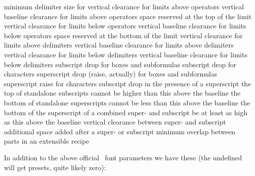 \NC \type {\Umathfractiondelsize}    \NC minimum delimiter size for  \NC \NR
\NC \type {\Umathlimitabovevgap}     \NC vertical clearance for limits above operators \NC \NR
\NC \type {\Umathlimitabovebgap}     \NC vertical baseline clearance for limits above operators \NC \NR
\NC \type {\Umathlimitabovekern}     \NC space reserved at the top of the limit \NC \NR
\NC \type {\Umathlimitbelowvgap}     \NC vertical clearance for limits below operators \NC \NR
\NC \type {\Umathlimitbelowbgap}     \NC vertical baseline clearance for limits below operators \NC \NR
\NC \type {\Umathlimitbelowkern}     \NC space reserved at the bottom of the limit \NC \NR
\NC \type {\Umathoverdelimitervgap}  \NC vertical clearance for limits above delimiters \NC \NR
\NC \type {\Umathoverdelimiterbgap}  \NC vertical baseline clearance for limits above delimiters \NC \NR
\NC \type {\Umathunderdelimitervgap} \NC vertical clearance for limits below delimiters \NC \NR
\NC \type {\Umathunderdelimiterbgap} \NC vertical baseline clearance for limits below delimiters \NC \NR
\NC \type {\Umathsubshiftdrop}       \NC subscript drop for boxes and subformulas \NC \NR
\NC \type {\Umathsubshiftdown}       \NC subscript drop for characters \NC \NR
\NC \type {\Umathsupshiftdrop}       \NC superscript drop (raise, actually) for boxes and subformulas \NC \NR
\NC \type {\Umathsupshiftup}         \NC superscript raise for characters \NC \NR
\NC \type {\Umathsubsupshiftdown}    \NC subscript drop in the presence of a superscript \NC \NR
\NC \type {\Umathsubtopmax}          \NC the top of standalone subscripts cannot be higher than this
                                       above the baseline \NC \NR
\NC \type {\Umathsupbottommin}       \NC the bottom of standalone superscripts cannot be less than
                                       this above the baseline \NC \NR
\NC \type {\Umathsupsubbottommax}    \NC the bottom of the superscript of a combined super- and subscript
                                       be at least as high as this above the baseline \NC \NR
\NC \type {\Umathsubsupvgap}         \NC vertical clearance between super- and subscript \NC \NR
\NC \type {\Umathspaceafterscript}   \NC additional space added after a super- or subscript \NC \NR
\NC \type {\Umathconnectoroverlapmin}\NC minimum overlap between parts in an extensible recipe \NC \NR
\LL
\stoptabulate

In addition to the above official \OPENTYPE\ font parameters we have these (the
undefined will get presets, quite likely zero):

